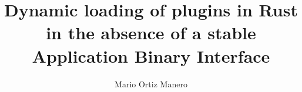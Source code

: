 \documentclass[a4paper,12pt,twoside,hidelinks,openright]{book}
\begin{document}
\title{Dynamic loading of plugins in Rust in the absence of a stable Application Binary Interface}
\author{Mario Ortiz Manero}

\pagebreak
\cleardoublepage%
\baselineskip 19pt

\renewcommand{\labelitemi}{$-$}
\renewcommand{\tablename}{Tabla}

\renewcommand{\appendixname}{Anexos}
\renewcommand{\appendixtocname}{Anexos}
\renewcommand{\appendixpagename}{Anexos}



\begingroup
\setlength{\parskip}{\baselineskip}%
\setlength{\parindent}{0pt}%

\newpage
\cleardoublepage%


\newpage
\cleardoublepage%


\newpage
\cleardoublepage%

\endgroup

\newpage
\cleardoublepage%
\renewcommand{\contentsname}{Índice}
\tableofcontents


\begingroup
\setlength{\parskip}{\baselineskip}%
\setlength{\parindent}{0pt}%







\endgroup

\printbibliography%
\nocite{*} %

\newpage
\renewcommand\listfigurename{Lista de Figuras}
\listoffigures

\newpage
\renewcommand\listtablename{Lista de Tablas}
\listoftables


\setlength{\parskip}{\baselineskip}%
\setlength{\parindent}{0pt}%

\newpage
\appendix
\clearpage
\addappheadtotoc%
\appendixpage%

\end{document}
